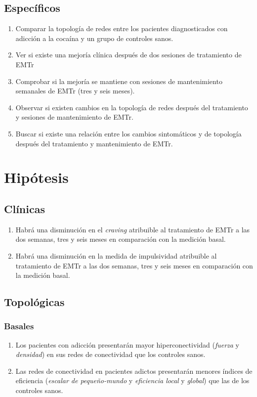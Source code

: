 \subsection{Específicos}
\begin{enumerate}[label=Específico \arabic*., left= \parindent]

    \item Comparar la topología de redes entre los pacientes diagnosticados con adicción a la cocaína y un grupo de controles sanos.
    \item Ver si existe una mejoría clínica después de dos sesiones de tratamiento de EMTr
    \item Comprobar si la mejoría se mantiene con sesiones de mantenimiento semanales de EMTr (tres y seis meses).
    \item Observar si existen cambios en la topología de redes después del tratamiento y sesiones de mantenimiento de EMTr.
    \item Buscar si existe una relación entre los cambios sintomáticos y de topología después del tratamiento y mantenimiento de EMTr.
\end{enumerate}

\section{Hipótesis}
\subsection{Clínicas}
\begin{enumerate}[label=Hipótesis \arabic*., left= \parindent]
    \item Habrá una disminución en el \textit{craving} atribuible al tratamiento de EMTr a las dos semanas, tres y seis meses en comparación con la medición basal.
    \item Habrá una disminución en la medida de impulsividad atribuible al tratamiento de EMTr a las dos semanas, tres y seis meses en comparación con la medición basal.
\end{enumerate}
\subsection{Topológicas}
    \subsubsection{Basales}
    \begin{enumerate}[resume,label=Hipótesis \arabic*., left= \parindent]
        \item Los pacientes con adicción presentarán mayor hiperconectividad (\emph{fuerza} y \emph{densidad}) en sus redes de conectividad que los controles sanos.
        \item Las redes de conectividad en pacientes adictos presentarán menores índices de eficiencia (\emph{escalar de pequeño-mundo} y \emph{eficiencia local} y \emph{global}) que las de los controles sanos.
    \end{enumerate}
